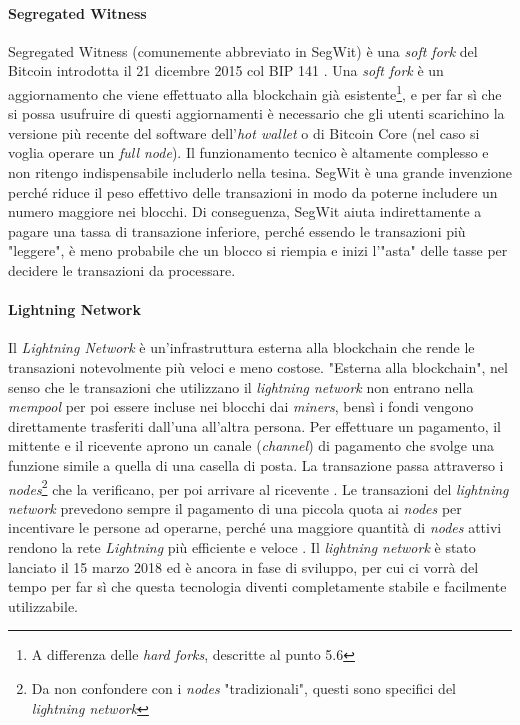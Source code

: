 \documentclass {article}
\begin{document}
\paragraph {Segregated Witness}

Segregated Witness (comunemente abbreviato in SegWit) è una \textit{soft fork} del Bitcoin introdotta il 21 dicembre 2015 col BIP 141 \cite{bip141}.
Una \textit{soft fork} è un aggiornamento che viene effettuato alla blockchain già esistente\footnote{A differenza delle \textit{hard forks}, descritte al punto 5.6}, e per far sì che si possa usufruire di questi aggiornamenti è necessario che gli utenti scarichino la versione più recente del software dell'\textit{hot wallet} o di Bitcoin Core (nel caso si voglia operare un \textit{full node}).
Il funzionamento tecnico è altamente complesso e non ritengo indispensabile includerlo nella tesina.
SegWit è una grande invenzione perché riduce il peso effettivo delle transazioni in modo da poterne includere un numero maggiore nei blocchi.
Di conseguenza, SegWit aiuta indirettamente a pagare una tassa di transazione inferiore, perché essendo le transazioni più "leggere", è meno probabile che un blocco si riempia e inizi l'"asta" delle tasse per decidere le transazioni da processare.

\paragraph {Lightning Network}

Il \textit{Lightning Network} è un'infrastruttura esterna alla blockchain che rende le transazioni notevolmente più veloci e meno costose.
"Esterna alla blockchain", nel senso che le transazioni che utilizzano il \textit{lightning network} non entrano nella \textit{mempool} per poi essere incluse nei blocchi dai \textit{miners}, bensì i fondi vengono direttamente trasferiti dall'una all'altra persona.
Per effettuare un pagamento, il mittente e il ricevente aprono un canale (\textit{channel}) di pagamento che svolge una funzione simile a quella di una casella di posta.
La transazione passa attraverso i \textit{nodes}\footnote{Da non confondere con i \textit{nodes} "tradizionali", questi sono specifici del \textit{lightning network}} che la verificano, per poi arrivare al ricevente \cite{lnhow}.
Le transazioni del \textit{lightning network} prevedono sempre il pagamento di una piccola quota ai \textit{nodes} per incentivare le persone ad operarne, perché una maggiore quantità di \textit{nodes} attivi rendono la rete \textit{Lightning} più efficiente e veloce \cite{lnfees}.
Il \textit{lightning network} è stato lanciato il 15 marzo 2018 \cite{lightninglaunch} ed è ancora in fase di sviluppo, per cui ci vorrà del tempo per far sì che questa tecnologia diventi completamente stabile e facilmente utilizzabile.
\end{document}
